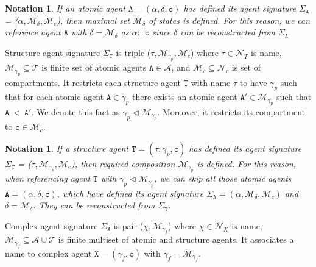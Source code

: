 \documentclass{entcs}
\renewcommand{\~}[0]{\texttildelow}
\newtheorem{notation}[thm]{Notation}
\begin{document}
\begin{notation}
If an atomic agent $\mathtt{A} = (\alpha, \delta, \mathtt{c})$ has defined its agent signature $\Sigma_\mathtt{A}$ = ($\alpha, \mathcal{M}_\delta, \mathcal{M}_c$), then maximal set $\mathcal{M}_\delta$ of states is defined. For this reason, we can reference agent $\mathtt{A}$ with $\delta = \mathcal{M}_\delta$ as $\alpha::\mathtt{c}$ since $\delta$ can be reconstructed from $\Sigma_\mathtt{A}$.
\end{notation}

\begin{defn}
Structure agent signature $\Sigma_\mathtt{T}$ is triple ($\tau, \mathcal{M}_{\gamma_p}, \mathcal{M}_c$) where $\tau \in \mathcal{N}_{T}$ is name, $\mathcal{M}_{\gamma_p} \subseteq \mathcal{T}$ is finite set of atomic agents $\mathtt{A} \in \mathcal{A}$, and $\mathcal{M}_c \subseteq \mathcal{N}_{c}$ is set of compartments. It restricts each structure agent $\mathtt{T}$ with name $\tau$ to have $\gamma_p$ such that for each atomic agent $\mathtt{A} \in \gamma_p$ there exists an atomic agent $\mathtt{A}' \in \mathcal{M}_{\gamma_p}$ such that $\mathtt{A}~\lhd~\mathtt{A}'$. We denote this fact as $\gamma_p \lhd \mathcal{M}_{\gamma_p}$. Moreover, it restricts its compartment to $\mathtt{c} \in \mathcal{M}_c$. 
\end{defn}

\begin{notation}
If a structure agent $\mathtt{T} = (\tau, \gamma_p, \mathtt{c})$ has defined its agent signature $\Sigma_\mathtt{T}$ = ($\tau, \mathcal{M}_{\gamma_p}, \mathcal{M}_c$), then required composition $\mathcal{M}_{\gamma_p}$ is defined. For this reason, when referencing agent $\mathtt{T}$ with $\gamma_p \lhd \mathcal{M}_{\gamma_p}$, we can skip all those atomic agents $\mathtt{A} = (\alpha, \delta, \mathtt{c})$, which have defined its agent signature $\Sigma_\mathtt{A} = (\alpha, \mathcal{M}_\delta, \mathcal{M}_c)$ and $\delta = \mathcal{M}_\delta$. They can be reconstructed from $\Sigma_\mathtt{T}$.
\end{notation}

\begin{defn}
Complex agent signature $\Sigma_\mathtt{X}$ is pair ($\chi, \mathcal{M}_{\gamma_f}$) where $\chi \in \mathcal{N}_{X}$ is name, $\mathcal{M}_{\gamma_f} \subseteq \mathcal{A} \cup \mathcal{T}$ is finite multiset of atomic and structure agents. It associates a name to complex agent $\mathtt{X} = (\gamma_f, \mathtt{c})$ with $\gamma_f = \mathcal{M}_{\gamma_f}$.
\end{defn}
\end{document}
